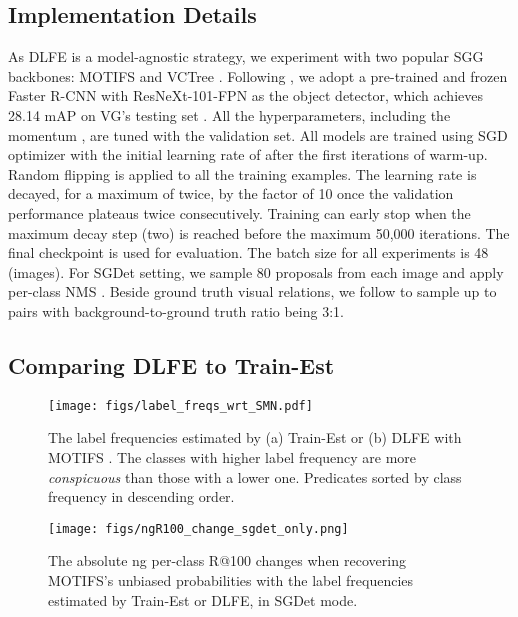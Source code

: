 \documentclass[sigconf]{acmart}
\begin{document}
\subsection{Implementation Details}
\label{sec:impl_detail}
As DLFE is a model-agnostic strategy, we experiment with two popular SGG backbones: MOTIFS \cite{zellers2018neural} and VCTree \cite{tang2019learning}.
Following \cite{tang2020unbiased,DBLP:conf/bmvc/WangPL20}, we adopt a pre-trained and frozen Faster R-CNN \cite{ren2015faster} with ResNeXt-101-FPN \cite{lin2017feature} as the object detector, which achieves 28.14 mAP on VG's testing set \cite{tang2020unbiased}.
All the hyperparameters, including the momentum , are tuned with the validation set.
All models are trained using SGD optimizer with the initial learning rate of  after the first  iterations of warm-up.
Random flipping is applied to all the training examples.
The learning rate is decayed, for a maximum of twice, by the factor of 10 once the validation performance plateaus twice consecutively.
Training can early stop when the maximum decay step (two) is reached before the maximum 50,000 iterations.
The final checkpoint is used for evaluation.
The batch size for all experiments is 48 (images).
For SGDet setting, we sample 80 proposals from each image and apply per-class NMS \cite{rosenfeld1971edge}.
Beside ground truth visual relations, we follow \cite{tang2020unbiased} to sample up to  pairs with background-to-ground truth ratio being 3:1.


\subsection{Comparing DLFE to Train-Est}
\label{sec:compare_dlfe_to_train_est}

\begin{figure}[t!]
\begin{center}
\texttt{[image: figs/label\_freqs\_wrt\_SMN.pdf]}
\end{center}
\vspace{-1.8em}
  \caption{
  The label frequencies estimated by (a) Train-Est or (b) DLFE with MOTIFS \cite{zellers2018neural}.
  The classes with higher label frequency are more \textit{conspicuous} than those with a lower one.
  Predicates sorted by class frequency in descending order.
}
\label{fig:compare_label_freq}
\vspace{-0.7em}
\end{figure}

\begin{figure}[t!]
\begin{center}
\texttt{[image: figs/ngR100\_change\_sgdet\_only.png]}
\end{center}
\vspace{-1.8em}
  \caption{
  The absolute ng per-class R@100 changes when recovering MOTIFS's \cite{zellers2018neural} unbiased probabilities with the label frequencies estimated by Train-Est or DLFE, in SGDet mode.
}
\label{fig:ngr_compairson}
\vspace{-1.5em}
\end{figure}
\end{document}
